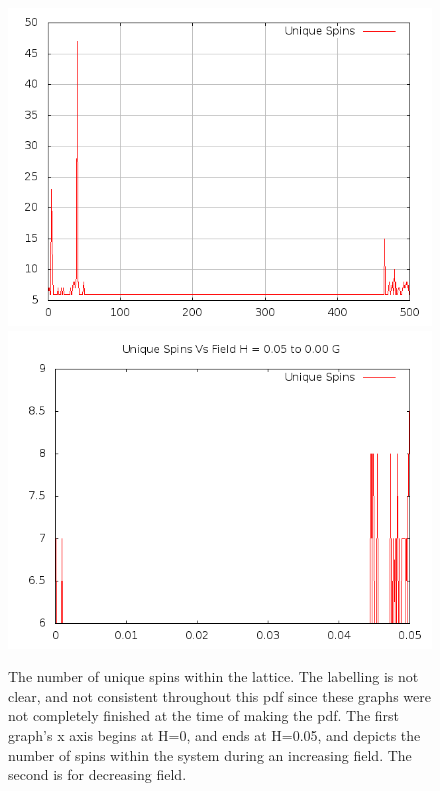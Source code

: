 \documentclass{article}
\begin{document}
\begin{figure}[ht]
\centering
\includegraphics[scale=0.5]{100/000to005Freq.png}
\includegraphics[scale=0.5]{100/005to000Freq.png}
\caption{The number of unique spins within the lattice. The labelling is
not clear, and not consistent throughout this pdf since these graphs were not completely finished at the time of making the pdf. The first
graph's x axis begins at H=0, and ends at H=0.05, and depicts the number of spins within the system during an increasing field. The second
is for decreasing field.}
\end{figure}
\clearpage
\end{document}
